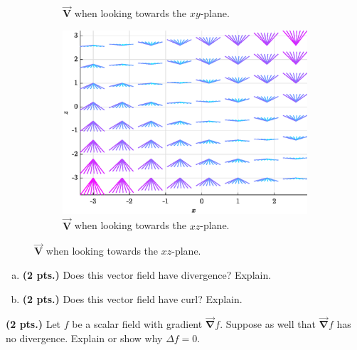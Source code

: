 \documentclass[12pt]{amsbook}
\newcommand{\vecfieldV}{\boldsymbol{\vec{V}}}
\newcommand{\grad}{\boldsymbol{\vec{\nabla}}}
\begin{document}
\begin{problem}
\begin{figure}[H]
\begin{subfigure}[b]{0.45\textwidth}
        \caption{$\vecfieldV$ when looking towards the $xy$-plane.}
    \end{subfigure}
    \quad
    \begin{subfigure}[b]{0.45\textwidth}
        \centering
        \includegraphics[width=\textwidth]{figures/vecfield_xz}
        \caption{$\vecfieldV$ when looking towards the $xz$-plane.}
    \end{subfigure}
\end{figure}
\begin{enumerate}[(a)]
    \item \textbf{(2 pts.)} Does this vector field have divergence? Explain.
    \item \textbf{(2 pts.)} Does this vector field have curl? Explain.
\end{enumerate}
\end{problem}



\begin{problem}
\textbf{(2 pts.)}  Let $f$ be a scalar field with gradient $\grad f$. Suppose as well that $\grad f$ has no divergence. Explain or show why $\Delta f = 0$.
\end{problem}
\end{document}
